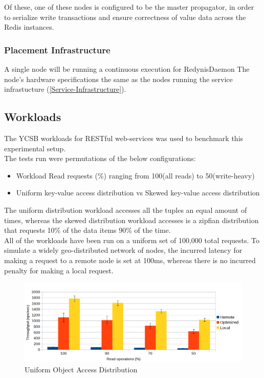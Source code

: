 \documentclass{sig-alternate}
\begin{document}
Of these, one of these nodes is configured to be the master propagator, in order to serialize write transactions and ensure correctness of value data across the Redis instances.\\

\subsubsection{Placement Infrastructure}
A single node will be running a continuous execution for RedynisDaemon \cite{redynis-daemon}
The node's hardware specifications the same as the nodes running the service infrastucture (\ref{Service-Infrastructure}).\\

\subsection{Workloads}
The YCSB workloads for RESTful web-services was used to benchmark this experimental setup.\\

The tests run were permutations of the below configurations:
\begin{itemize}
	\item  Workload Read requests (\%) ranging from 100(all reads) to 50(write-heavy)
	\item  Uniform key-value access distribution vs Skewed key-value access distribution
\end{itemize}

The uniform distribution workload accesses all the tuples an equal amount of times, whereas the skewed distribution workload accesses is a zipfian distribution that requests 10\% of the data items 90\% of the time.\\

All of the workloads have been run on a uniform set of 100,000 total requests. To simulate a widely geo-distributed network of nodes, the incurred latency for making a request to a remote node is set at 100ms\cite{latency-stats}, whereas there is no incurred penalty for making a local request.\\


\begin{figure}[ht]
\centering
\includegraphics[width=\textwidth]{images/Uniform-dist-throughput.png}
\caption{Uniform Object Access Distribution}
\label{fig:res-unif}
\end{figure}
\end{document}
